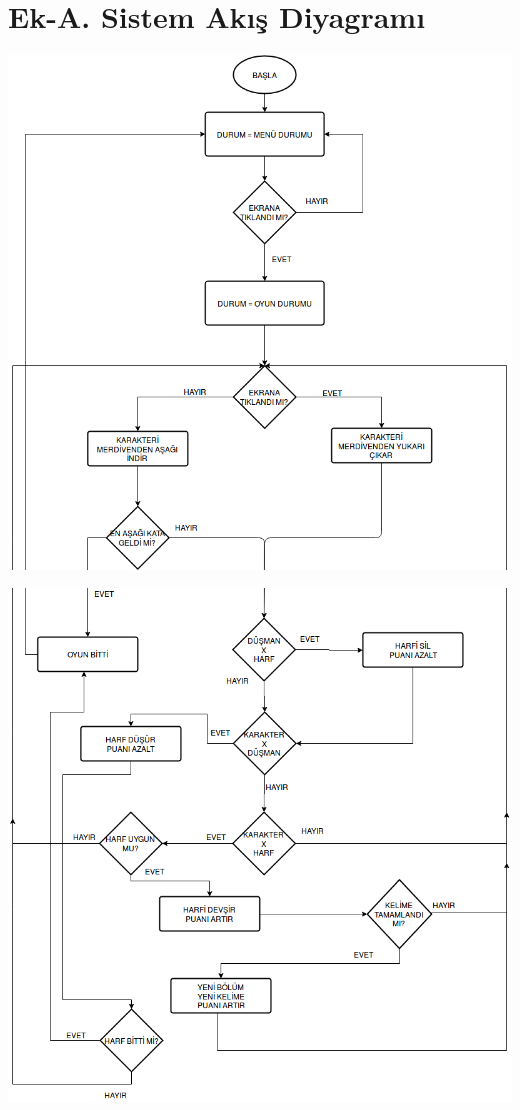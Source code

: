 \documentclass[12pt,a4paper]{article}
\begin{document}
   \section{Ek-A. Sistem Akış Diyagramı} \label{fc}
      \begin{center}
         \includegraphics[width=\linewidth]{res/slice_flc_1.png}
      \end{center}

      \begin{center}
         \includegraphics[width=\linewidth]{res/slice_flc_2.png}
      \end{center}
\end{document}
